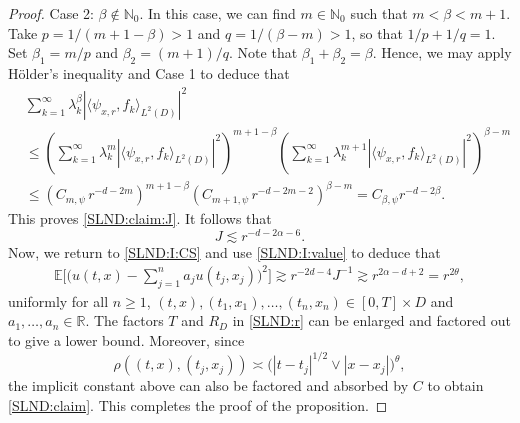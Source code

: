 \documentclass[reqno]{amsart}
\DeclareMathOperator{\Var}{Var}
\newcommand{\R}{\mathbb R}
\newcommand{\N}{\mathbb N}
\newcommand{\E}{\mathbb E}
\newcommand{\1}{\mathbf 1}
\numberwithin{equation}{section}
\theoremstyle{definition}
\begin{document}
\begin{proof}
Case 2: $\beta \not\in \N_0$. In this case, we can find $m \in \N_0$ such that $m < \beta < m+1$.
Take $p = 1/(m+1-\beta)>1$ and $q = 1/(\beta-m)>1$, so that $1/p+1/q=1$.
Set $\beta_1 = m/p$ and $\beta_2 = (m+1)/q$.
Note that $\beta_1+\beta_2 = \beta$.
Hence, we may apply H\"older's inequality and Case 1 to deduce that
\begin{align*}
	&\sum_{k=1}^\infty \lambda_k^{\beta} \left| \langle \psi_{x,r}, f_k \rangle_{L^2(D)} \right|^2\\
	&\le \left( \sum_{k=1}^\infty \lambda_k^m \left| \langle \psi_{x,r}, f_k \rangle_{L^2(D)} \right|^2\right)^{m+1-\beta} \left(\sum_{k=1}^\infty \lambda_k^{m+1} \left| \langle \psi_{x,r}, f_k \rangle_{L^2(D)} \right|^2\right)^{\beta-m}\\
	& \le \left(C_{m,\psi} \, r^{-d-2m} \right)^{m+1-\beta} \left( C_{m+1,\psi} \, r^{-d-2m-2} \right)^{\beta-m}
	= C_{\beta, \psi} r^{-d-2\beta}.
\end{align*}
This proves \eqref{SLND:claim:J}.
It follows that
\[
	J\lesssim r^{-d-2\alpha-6}.
\]
Now, we return to \eqref{SLND:I:CS} and use \eqref{SLND:I:value} to deduce that
\begin{align}\label{SLND:claim:proved}
    \E\Bigg[\bigg(u(t,x)-\sum_{j=1}^n a_j u(t_j,x_j)\bigg)^2\Bigg]
    \gtrsim
    r^{-2d-4} J^{-1}
    \gtrsim
    r^{2\alpha-d+2}
    =
    r^{2\theta},
\end{align}
uniformly for all $n \ge 1$, $(t,x),(t_1,x_1),\dots, (t_n,x_n) \in [0,T]\times D$ and $a_1,\dots, a_n \in \R$.
The factors $T$ and $R_D$ in \eqref{SLND:r} can be enlarged and factored out to give a lower bound.
Moreover, since
\[
    \rho((t,x),(t_j,x_j))
    \asymp
    \bigl(|t-t_j|^{1/2}\vee |x-x_j|\bigr)^{\theta},
\]
the implicit constant above can also be factored and absorbed by $C$ to obtain \eqref{SLND:claim}.
This completes the proof of the proposition.
\end{proof}
\end{document}
